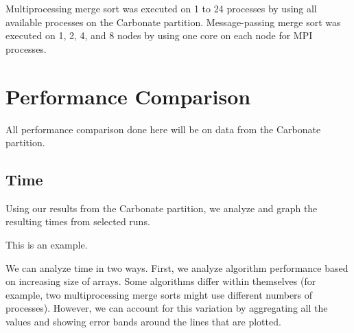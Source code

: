 Multiprocessing merge sort was executed on 1 to 24 processes by using all available processes on the Carbonate partition. Message-passing merge sort was executed on 1, 2, 4, and 8 nodes by using one core on each node for MPI processes. 

\section{Performance Comparison}

All performance comparison done here will be on data from the Carbonate partition. 

\subsection{Time}

Using our results from the Carbonate partition, we analyze and graph the resulting times from selected runs. 

\begin{table}
    \caption{This is an example.}
    \label{tab:times-sort}
    \centering
\end{table}

We can analyze time in two ways. First, we analyze algorithm performance based on increasing size of arrays. Some algorithms differ within themselves (for example, two multiprocessing merge sorts might use different numbers of processes). However, we can account for this variation by aggregating all the values and showing error bands around the lines that are plotted. 

